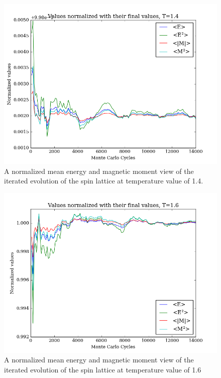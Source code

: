 \documentclass[11pt,a4paper,notitlepage,twocolumn]{article}
\begin{document}
\begin{figure}
[H]\center
\includegraphics[scale=0.35]{../figs/4c/Prob_L20_mc100000_T140_spinup.png}
\caption{A normalized mean energy and magnetic moment view of the iterated evolution of the spin lattice at temperature value of 1.4.}
\end{figure}
\begin{figure}
[H]\center
\includegraphics[scale=0.35]{../figs/4c/Prob_L20_mc100000_T160_spinup.png}
\caption{A normalized mean energy and magnetic moment view of the iterated evolution of the spin lattice at temperature value of 1.6}
\end{figure}
\end{document}
